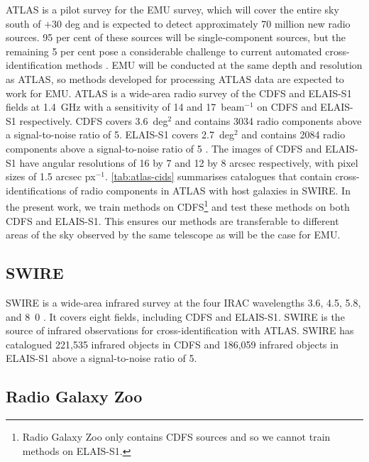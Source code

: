     ATLAS is a pilot survey for the EMU \citep{norris11} survey, which will
    cover the entire sky south of $+30$ deg and is expected to detect
    approximately 70 million new radio sources. {95 per cent of these sources
    will be single-component sources, but the remaining 5 per cent pose a
    considerable challenge to current automated cross-identification methods
    \citep{norris11}.} EMU will be conducted at the same depth and resolution
    as ATLAS, so methods developed for processing ATLAS data are expected to
    work for EMU. ATLAS is a wide-area radio survey of the CDFS and ELAIS-S1
    fields at 1.4~GHz with a sensitivity of 14 and
    \unit{17}{\micro\jansky}~beam$^{-1}$ on CDFS and ELAIS-S1 respectively.
    CDFS covers 3.6~deg$^2$ and contains 3034 radio components above a
    signal-to-noise ratio of 5. ELAIS-S1 covers 2.7~deg$^2$ and contains 2084
    radio components above a signal-to-noise ratio of 5 \citep{franzen15}. The
    images of CDFS and ELAIS-S1 have angular resolutions of 16 by 7 and 12 by
    8 arcsec respectively, with pixel sizes of 1.5 arcsec px$^{-1}$.
    \autoref{tab:atlas-cids} summarises catalogues that contain
    cross-identifications of radio components in ATLAS with host galaxies in
    SWIRE. In the present work, we train methods on
    CDFS\footnote{{Radio Galaxy Zoo only contains CDFS sources and so
    we cannot train methods on ELAIS-S1.}} and test these methods on both CDFS
    and ELAIS-S1. This ensures our methods are transferable to different
    areas of the sky observed by the same telescope as will be the case for
    EMU.

  \subsection{SWIRE}\label{sec:atlas-xid-swire}

    SWIRE is a wide-area infrared
    survey at the four IRAC wavelengths 3.6, 4.5, 5.8, and
    \unit{8.0}{\micro\meter} \citep{lonsdale03swire, surace05swire}. It covers eight fields, including CDFS and ELAIS-S1. SWIRE is the source of infrared
    observations for cross-identification with ATLAS. SWIRE has catalogued 221,535
    infrared objects in CDFS and 186,059 infrared objects in ELAIS-S1 above a signal-to-noise ratio of 5.

  \subsection{Radio Galaxy Zoo}\label{sec:atlas-xid-rgz}

